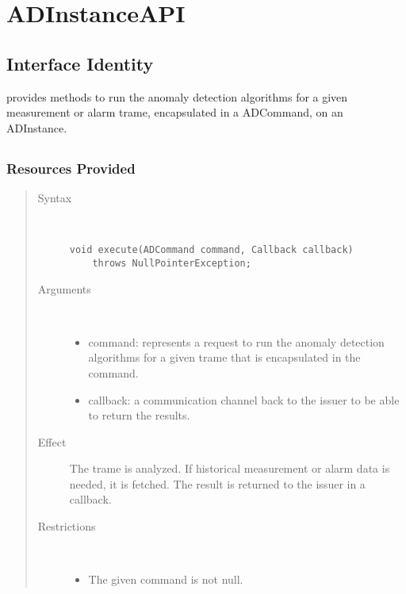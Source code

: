 \section{ADInstanceAPI}
\label{api:ad-instance-api}

\subsection{Interface Identity}

\npar {} provides methods to run the anomaly detection
algorithms for a given measurement or alarm trame, encapsulated in a ADCommand,
on an ADInstance.

\subsection{}

\subsubsection{Resources Provided}

\begin{quote}
	\begin{description}
		\item[Syntax] \ 
		\begin{verbatim}
void execute(ADCommand command, Callback callback) 
    throws NullPointerException;
		\end{verbatim}
		\item[Arguments] \
		\begin{itemize}
			\item command: represents a request to run the anomaly detection algorithms
			for a given trame that is encapsulated in the command.
			\item callback: a communication channel back to the issuer to be able to
			return the results.
		\end{itemize}
		\item[Effect] The trame is analyzed. If historical measurement or alarm data
		is needed, it is fetched. The result is returned to the issuer in a callback.
		\item[Restrictions] \ 
		\begin{itemize}
			\item The given command is not null.
		\end{itemize}
	\end{description} 
\end{quote}

